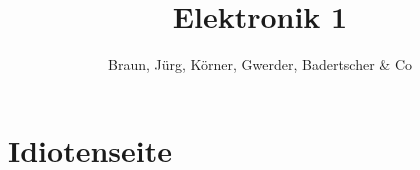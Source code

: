 \documentclass[10pt,twoside,a4paper,fleqn]{article}
\title{Elektronik 1}
\author{Braun, Jürg, Körner, Gwerder, Badertscher \& Co}
\begin{document}
%









\newpage
\section{Idiotenseite}

\end{document}
